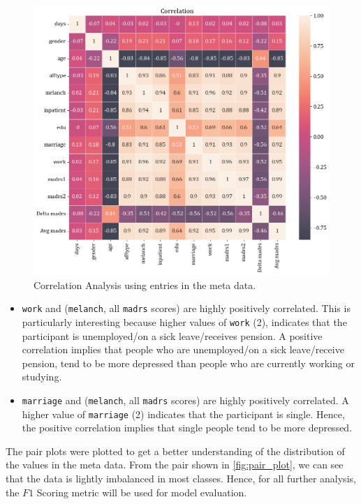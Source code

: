 \documentclass[11pt,a4paper]{article}
\newcommand{\noi}{\noindent}
\begin{document}
\begin{figure}[tb]
	\centering
	\includegraphics[scale=0.5]{images/score_corr.png}
	\caption{Correlation Analysis using entries in the meta data.}
	\label{fig:corr_plot}
\end{figure}

\begin{itemize}
	\itemsep0em
	\item \texttt{work} and (\texttt{melanch}, all \texttt{madrs} scores) are highly positively correlated. This is particularly interesting because higher values of \texttt{work} (2), indicates that the participant is unemployed/on a sick leave/receives pension. A positive correlation implies that people who are unemployed/on a sick leave/receive pension, tend to be more depressed than people who are currently working or studying.
	\item \texttt{marriage} and (\texttt{melanch}, all \texttt{madrs} scores) are highly positively correlated. A higher value of \texttt{marriage} (2) indicates that the participant is single. Hence, the positive correlation implies that single people tend to be more depressed. 
\end{itemize}

\noi
The pair plots were plotted to get a better understanding of the distribution of the values in the meta data. From the pair shown in \autoref{fig:pair_plot}, we can see that the data is lightly imbalanced in most classes. Hence, for all further analysis, the $F1$ Scoring metric will be used for model evaluation.
\end{document}
